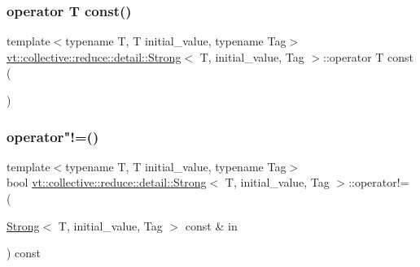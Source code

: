 \subsubsection{\texorpdfstring{operator T const()}{operator T const()}}
{\footnotesize\ttfamily template$<$typename T, T initial\+\_\+value, typename Tag$>$ \\
\hyperlink{structvt_1_1collective_1_1reduce_1_1detail_1_1_strong}{vt\+::collective\+::reduce\+::detail\+::\+Strong}$<$ T, initial\+\_\+value, Tag $>$\+::operator T const (\begin{DoxyParamCaption}{ }\end{DoxyParamCaption})\hspace{0.3cm}{\ttfamily [inline]}}

\mbox{\label{structvt_1_1collective_1_1reduce_1_1detail_1_1_strong_a82bf11914af5ac09c78eb102fb04607a}} 
\subsubsection{\texorpdfstring{operator"!=()}{operator!=()}}
{\footnotesize\ttfamily template$<$typename T, T initial\+\_\+value, typename Tag$>$ \\
bool \hyperlink{structvt_1_1collective_1_1reduce_1_1detail_1_1_strong}{vt\+::collective\+::reduce\+::detail\+::\+Strong}$<$ T, initial\+\_\+value, Tag $>$\+::operator!= (\begin{DoxyParamCaption}\item[{\hyperlink{structvt_1_1collective_1_1reduce_1_1detail_1_1_strong}{Strong}$<$ T, initial\+\_\+value, Tag $>$ const \&}]{in }\end{DoxyParamCaption}) const\hspace{0.3cm}{\ttfamily [inline]}}

\mbox{\label{structvt_1_1collective_1_1reduce_1_1detail_1_1_strong_ae4f668ef8de598177396f4dc575fce3c}} 
